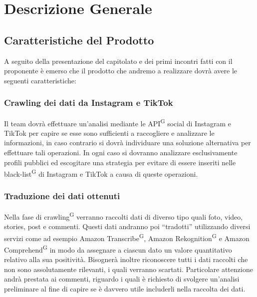 \section{Descrizione Generale}

\subsection{Caratteristiche del Prodotto}

A seguito della presentazione del capitolato e dei primi incontri fatti con il proponente è emerso che il prodotto che andremo a realizzare dovrà avere le seguenti caratteristiche:

\subsubsection{Crawling dei dati da Instagram e TikTok}
Il team dovrà effettuare un’analisi mediante le API\textsuperscript{G} social di Instagram e TikTok per capire se esse sono sufficienti a raccogliere e analizzare le informazioni, in caso contrario si dovrà individuare una soluzione alternativa per effettuare tali operazioni. In ogni caso si dovranno analizzare esclusivamente profili pubblici ed escogitare una strategia per evitare di essere inseriti nelle black-list\textsuperscript{G} di Instagram e TikTok a causa di queste operazioni.

\subsubsection{Traduzione dei dati ottenuti}
Nella fase di crawling\textsuperscript{G} verranno raccolti dati di diverso tipo quali foto, video, stories, post e commenti. Questi dati andranno poi “tradotti” utilizzando diversi servizi come ad esempio Amazon Transcribe\textsuperscript{G}, Amazon Rekognition\textsuperscript{G} e Amazon Comprehend\textsuperscript{G} in modo da assegnare a ciascun dato un valore quantitativo relativo alla sua positività. Bisognerà inoltre riconoscere tutti i dati raccolti che non sono assolutamente rilevanti, i quali verranno scartati. Particolare attenzione andrà prestata ai commenti, riguardo i quali è richiesto di svolgere un’analisi preliminare al fine di capire se è davvero utile includerli nella raccolta dei dati.

